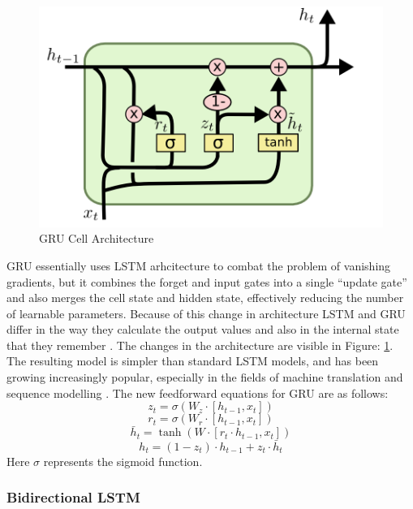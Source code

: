 \documentclass[letterpaper, 10 pt, conference]{ieeeconf}  %
\begin{document}
\begin{figure}[!h]
\centering
\includegraphics[scale=0.50]{../figs/gru/diagram.png}	
\caption{GRU Cell Architecture}
\label{fig:GRU_Arch} 
\end{figure}

GRU essentially uses LSTM arhcitecture to combat the problem of vanishing gradients, but it combines the forget and input gates into a single “update gate” and also merges the cell state and hidden state, effectively reducing the number of learnable parameters. Because of this change in architecture LSTM and GRU differ in the way they calculate the output values and also in the internal state that they remember \cite{gru_evaluation}. The changes in the architecture are visible in Figure: \ref{fig:GRU_Arch}. The resulting model is simpler than standard LSTM models, and has been growing increasingly popular, especially in the fields of machine translation \cite{gru_translation} and sequence modelling \cite{gru_evaluation}. The new feedforward equations for GRU are as follows:
\begin{equation}
z_t = \sigma(W_z \cdot [h_{t-1}, x_t])
\end{equation}
\begin{equation}
r_t = \sigma(W_r \cdot [h_{t-1}, x_t])
\end{equation}
\begin{equation}
\bar{h}_t = \tanh(W \cdot [r_t \cdot h_{t-1}, x_t])
\end{equation}
\begin{equation}
h_t = (1 - z_t) \cdot h_{t-1} + z_t \cdot \bar{h}_{t}
\end{equation}
Here $\sigma$ represents the sigmoid function.

\subsubsection{Bidirectional LSTM}
\end{document}
